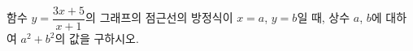 \hspace*{2mm}\begin{minipage}[t]{\dimexpr\linewidth-2mm\relax}\vspace{0pt}
함수 $y=\dfrac{3x+5}{x+1}$의 그래프의 점근선의 방정식이 $x=a$, $y=b$일 때, 상수 $a$, $b$에 대하여 $a^2+b^2$의 값을 구하시오.\end{minipage}
